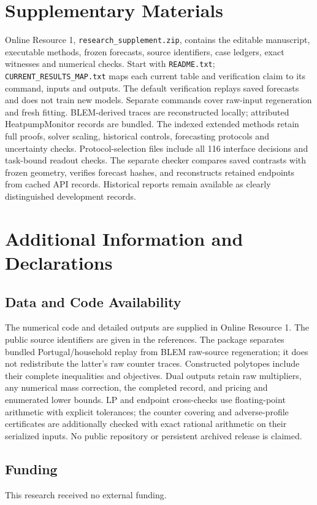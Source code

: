 \documentclass[12pt]{article}
\begin{document}
\section*{Supplementary Materials}
Online Resource 1, \texttt{research\_supplement.zip}, contains the editable
manuscript, executable methods, frozen forecasts, source identifiers, case
ledgers, exact witnesses and numerical checks. Start with \texttt{README.txt};
\texttt{CURRENT\_RESULTS\_MAP.txt} maps each current table and verification
claim to its command, inputs and outputs. The default verification replays
saved forecasts and does not train new models. Separate commands cover
raw-input regeneration and fresh fitting. BLEM-derived traces are reconstructed
locally; attributed HeatpumpMonitor records are bundled. The indexed extended
methods retain full proofs, solver scaling, historical controls, forecasting
protocols and uncertainty checks. Protocol-selection files include all 116
interface decisions and task-bound readout checks. The separate checker
compares saved contrasts with frozen geometry, verifies forecast hashes,
and reconstructs retained endpoints from cached API records. Historical
reports remain available as clearly distinguished development records.

\section*{Additional Information and Declarations}
\subsection*{Data and Code Availability}
The numerical code and detailed outputs are supplied in Online Resource 1.
The public source identifiers are given in the references. The package
separates bundled Portugal/household replay from BLEM raw-source
regeneration; it does not redistribute the latter's raw counter traces.
Constructed polytopes include their complete inequalities and objectives.
Dual outputs retain raw multipliers, any numerical mass correction, the
completed record, and pricing and enumerated lower bounds. LP and endpoint
cross-checks use floating-point arithmetic with explicit tolerances; the
counter covering and adverse-profile certificates are additionally checked
with exact rational arithmetic on their serialized inputs. No public
repository or persistent archived release is claimed.

\subsection*{Funding}
This research received no external funding.
\end{document}
